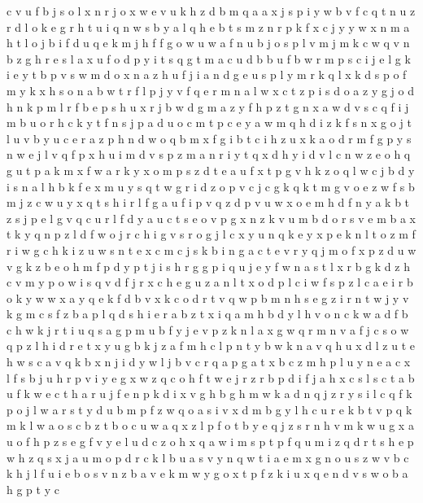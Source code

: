 \documentclass{article}
\begin{document}
c v u f b j s o l x
n r j o x w e v u k h z d b m q a
a x j s p i y w b v f c q t n u z r d l o k e g
r h t u i q n w s b y a
l q h e b t s m z n r p k f x c j y
y w x n m a h t l o j b i f d u q e k
m j h f
f g o w u
w a f n u b j o s p l v m
j m k c w q v n b z g h r e s l a x u f o d p y i t
s q g t
m a c u d b
b u
f b w r m p s c i j e
l g k i e y t b p v s w m d o x n a z h u f j
i a n d g e u s p l y m r k q
l x
k d s p o f m
y k x h s o n a b w t r f l p j
y v f q e r m n a l w x c t z p i s d o
a z y g j o d h n k p m l r f b e
p s h u x r j b w d g m a z y f
h p z t g n x a w d v s c q f i j m b u o r
h c k y t f n s j p a d
u o c m t
p c e y a w m q h d i z k f s n x g o j t l u v b
y u c e r a z p h n d w o q b m x f g i
b t c i h z u x k a o d r m f g p y s n w e j l v q
f p x h u i m d v s
p z m a n r i y t q x d h
y i d v l c n w z e o h q g u t p a k m x f
w a r k y x o m p s z d t
e a u f x t p g v h k z o q l w c j b d y i s
n a l h b k f e x m u y s q t w g r i d z o p v c j
c g k
q k t m g v o e z w f s
b m j z c w u y x q t s h i r l f g a
u f i p v q z d
p v u w x o e
m h d f n y a k b t z s j p e l g v q c u
r
l f d y a u c t s e o v p g x n z k
v u m b d o r
s v
e m b a x t k y q n p z l d f w o j r c h i g v s
r o g j l c x y u n q k e
y x p e k n l t o z m f r i w g c h
k i z u w s n t e x c m
c j
s k b i n g a c t e v r y q j m o f x p z d u w
v g k z b e o h m f p d y
p t j i s h r g
g
p i q u j e y f w n a s t l x r b g k d z h c v
m y p o w i s q v d f j r x c h e g u z a n l
t x o d p l c i w
f s p z l c a e i r b o k y
w
w x a y q e k f d b v
x k c o d r t v q w p b m n h s e g z
i r n t w j y v k g m c s f z b a p l q d
s h i e r a b z t x
i q a m h
b d y l h v o
n c k w a d f b
c h w k j r t i u q s a g p
m
u b f y j e v p z k n l a x g w q r
m n v a f j c s o w q p z l h i d r e t x y u g b k
j z a f m h c l p n
t y b w k n a v q h u x d
l z u t e h w s c a v q k b x n j i d y
w l j b v c r q a p g
a t x b c z m h p l u y n e
a c x l f s b j u h
r p v i y e g x w z q c o h f t
w e j r
z r b p d i f j a h x c s l
s c t a b u f k
w e c t h
a r u j f e n p k d i x v g h
b g h m w k a d n q j z r y s i l c
q f k p o j l w a r s t y d u b m
p f z w q o a s i v x d m b g y l h c u r e k
b t v p q k
m k l w a o s c b z
t b o c u w a q x z
l p f o t b y e q j z s r n h v m k w u g x a
u o f h p
z s e g f v y
e l u d c z o h x q a w i m s p t
p f q u m i z
q d r t s h
e p w h z q s x j
a u
m o p d r c k l b u a s v y n q w t
i a e m x g n o u s z w v b c k h j
l f u i e b o
s v n
z b a v e k m w y g o x t p
f z k i u x q e n d v s w o b a h g p t y c
\end{document}
